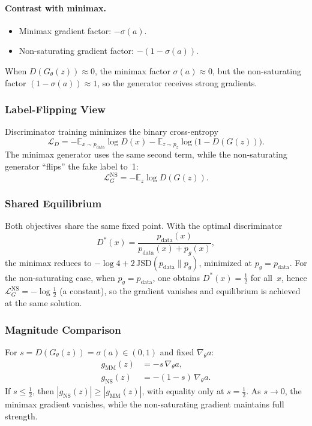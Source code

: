 \documentclass[11pt]{article}
\theoremstyle{remark}
\begin{document}
\paragraph{Contrast with minimax.}
\begin{itemize}
  \item Minimax gradient factor: $-\sigma(a)$.
  \item Non-saturating gradient factor: $-(1-\sigma(a))$.
\end{itemize}
When $D(G_\theta(z))\approx 0$, the minimax factor $\sigma(a)\approx 0$,
but the non-saturating factor $(1-\sigma(a))\approx 1$, so the generator
receives strong gradients.

\subsubsection{Label-Flipping View}

Discriminator training minimizes the binary cross-entropy
\begin{equation}
\mathcal{L}_D
= -\mathbb{E}_{x\sim p_{\text{data}}}\log D(x)
 -\mathbb{E}_{z\sim p_z}\log\!\big(1-D(G(z))\big).
\end{equation}
The minimax generator uses the same second term,
while the non-saturating generator ``flips'' the fake label to~1:
\begin{equation}
\mathcal{L}^{\text{NS}}_G = -\mathbb{E}_{z}\log D(G(z)).
\end{equation}

\subsubsection{Shared Equilibrium}

Both objectives share the same fixed point. With the optimal discriminator
\[
D^*(x)=\frac{p_{\text{data}}(x)}{p_{\text{data}}(x)+p_g(x)},
\]
the minimax reduces to $-\log 4 + 2\,\mathrm{JSD}(p_{\text{data}}\|p_g)$,
minimized at $p_g=p_{\text{data}}$. For the non-saturating case,
when $p_g=p_{\text{data}}$, one obtains $D^*(x)=\tfrac12$ for all~$x$,
hence $\mathcal{L}^{\text{NS}}_G=-\log\tfrac12$ (a constant),
so the gradient vanishes and equilibrium is achieved at the same solution.

\subsubsection{Magnitude Comparison}

For $s=D(G_\theta(z))=\sigma(a)\in(0,1)$ and fixed $\nabla_\theta a$:
\begin{align}
g_{\text{MM}}(z) &= -s\,\nabla_\theta a, \\
g_{\text{NS}}(z) &= -(1-s)\,\nabla_\theta a.
\end{align}
If $s\le \tfrac{1}{2}$, then $|g_{\text{NS}}(z)| \ge |g_{\text{MM}}(z)|$,
with equality only at $s=\tfrac12$. As $s\to 0$, the minimax gradient vanishes,
while the non-saturating gradient maintains full strength.
\end{document}
